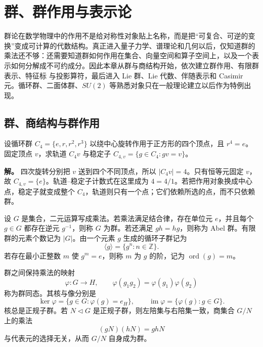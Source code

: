 \chapter{群、群作用与表示论} \label{chap:math-structures}
\label{chap:group-theory}

群论在数学物理中的作用不是给对称性对象贴上名称，而是把“可复合、可逆的变换”变成可计算的代数结构。真正进入量子力学、谱理论和几何以后，仅知道群的乘法还不够：还需要知道群如何作用在集合、向量空间和算子空间上，以及一个表示如何分解成不可约成分。因此本章从群与商结构开始，依次建立群作用、有限群表示、特征标 与投影算符，最后进入 Lie 群、Lie 代数、伴随表示和 Casimir 元。循环群、二面体群、$SU(2)$ 等熟悉对象只在一般理论建立以后作为特例出现。



\section{群、商结构与群作用}

\begin{workedexample}[正方形顶点的轨道与稳定子]
设循环群 \(C_4=\{e,r,r^2,r^3\}\) 以绕中心旋转作用于正方形的四个顶点，且 \(r^4=e\)。固定顶点 \(v\)，求轨道 \(C_4v\) 与稳定子 \(C_{4,v}=\{g\in C_4:gv=v\}\)。

\textbf{解。} 四次旋转分别把 \(v\) 送到四个不同顶点，所以 \(|C_4v|=4\)。只有恒等元固定 \(v\)，故 \(C_{4,v}=\{e\}\)。轨道--稳定子计数式在这里成为 \(4=4/1\)。若把作用对象换成中心点，稳定子就变成整个 \(C_4\)，轨道则只有一个点；它们依赖所选的点，而不只依赖群。
\end{workedexample}

\label{sec:group-basics}
\begin{definition}[群、循环子群与元素的阶]
设 $G$ 是集合，二元运算写成乘法。若乘法满足结合律，存在单位元 $e$，并且每个 $g\in G$ 都存在逆元 $g^{-1}$，则称 $G$ 为群。若还满足 $gh=hg$，则称为 Abel 群。有限群的元素个数记为 $|G|$。由一个元素 $g$ 生成的循环子群记为
\[
\langle g\rangle=\{g^n:n\in\mathbb Z\}.
\]
若存在最小正整数 $m$ 使 $g^m=e$，则称 $m$ 为 $g$ 的阶，记为 $\operatorname{ord}(g)=m$。
\end{definition}

\begin{definition}
群之间保持乘法的映射
\[
\varphi:G\longrightarrow H,
\qquad
\varphi(g_1g_2)=\varphi(g_1)\varphi(g_2)
\]
称为群同态。其核与像分别是
\[
\ker\varphi=\{g\in G:\varphi(g)=e_H\},
\qquad
\operatorname{im}\varphi=\{\varphi(g):g\in G\}.
\]
核总是正规子群。若 $N\triangleleft G$ 是正规子群，则左陪集与右陪集一致，商集合 $G/N$ 上的乘法
\[
(gN)(hN)=ghN
\]
与代表元的选择无关，从而 $G/N$ 自身成为群。
\end{definition}

